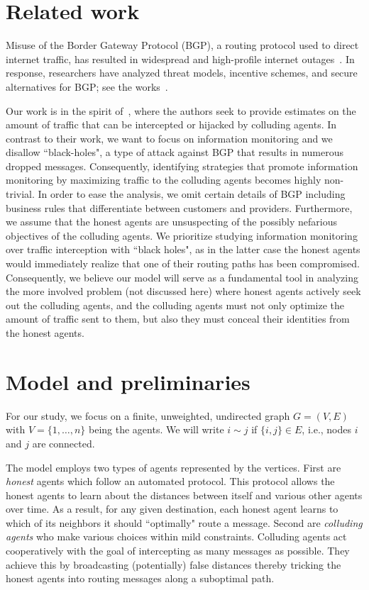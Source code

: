 \documentclass{comnet}
\begin{document}
\section{Related work} \label{sec:related}
Misuse of the Border Gateway Protocol (BGP), a routing protocol used to direct
internet traffic, has resulted in widespread and high-profile internet
outages~\cite{Stone08}. In response, researchers have analyzed threat models,
incentive schemes, and secure alternatives for BGP; see the
works~\cite{ButlerFMR10,GoldbergSHR10,BallaniFZ07,NordstromD04,GoldbergHJRW08,LevinSZ08}.

Our work is in the spirit of~\cite{BallaniFZ07}, where the 
authors seek to provide estimates on the amount of traffic that can be intercepted or 
hijacked by colluding agents.  In contrast to their work, we want to focus on 
information monitoring and we disallow ``black-holes", a type of attack against BGP 
that results in numerous dropped messages.  Consequently, identifying strategies 
that promote information monitoring by maximizing traffic to the colluding agents  
becomes highly non-trivial.  In order to ease the analysis, we omit certain details of 
BGP including business rules that differentiate between customers and providers.  
Furthermore, we assume that the honest agents are unsuspecting of the possibly
nefarious objectives of the colluding agents.  We prioritize studying information 
monitoring over traffic interception with ``black holes", as in the latter case the 
honest agents would immediately realize that one of their routing paths has been 
compromised.  Consequently, we believe our model will serve as a fundamental 
tool in analyzing the more involved problem (not discussed here) where honest 
agents actively seek out the colluding agents, and the colluding agents must
not only optimize the amount of traffic sent to them, but also they must conceal their identities from the honest agents. 
\section{Model and preliminaries} \label{sec:models}

For our study, we focus on a finite, unweighted, undirected graph $G =
(V,E)$ with $V = \{1, \dots, n\}$ being the agents. We will write $i \sim j$ if $\{i,j\} \in E$, i.e., nodes $i$ and $j$ are connected.

The model employs two types of agents represented by the vertices. First are {\it honest} agents which follow an automated protocol. This protocol allows the honest agents to learn about the distances between itself and various other agents over time. As a result, for any given destination, each honest agent learns to which of its neighbors it should ``optimally" route a message. Second are {\it colluding agents} who make various choices within mild constraints. Colluding agents act cooperatively with the goal of intercepting as many messages as possible. They achieve this by broadcasting (potentially) false distances thereby tricking the honest agents into routing messages along a suboptimal path.
\end{document}
